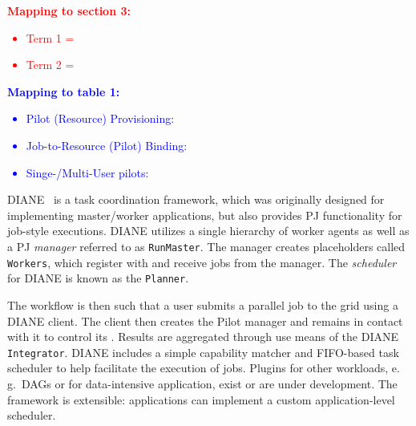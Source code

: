 \documentclass{sig-alternate}
\begin{document}
\textcolor{red}
{
\textbf{Mapping to section 3:}
\begin{itemize}
\item Term 1 =
\item Term 2 =
\end{itemize}
}

\textcolor{blue}
{
\textbf{Mapping to table 1:}
\begin{itemize}
\item Pilot (Resource) Provisioning:
\item Job-to-Resource (Pilot) Binding:
\item Singe-/Multi-User pilots:
\end{itemize}
}



DIANE~\cite{Moscicki:908910} is a task coordination framework, which
was originally designed for implementing master/worker applications,
but also provides PJ functionality for job-style executions.
DIANE utilizes a single hierarchy of worker agents as well as a PJ \textit{manager}
referred to as \texttt{RunMaster}.  The manager creates
placeholders called \texttt{Workers}, which register with and receive jobs from the manager.
The \textit{scheduler} for DIANE is known as the \texttt{Planner}.


The workflow is then such that a user submits a parallel job to
the grid using a DIANE client.  The client then creates the Pilot manager
and remains in contact with it to control its \pilotjobs.  Results
are aggregated through use means of the DIANE
\texttt{Integrator}.
DIANE includes a simple capability matcher and FIFO-based task scheduler
to help facilitate the execution of jobs.
Plugins for other workloads, e.\,g.\ DAGs or for data-intensive
application, exist or are under development. The framework is extensible:
applications can implement a custom application-level scheduler.
\end{document}
